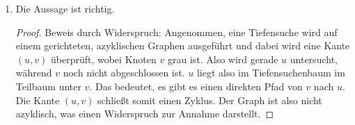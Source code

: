 \documentclass[11pt,a4paper]{article}
\begin{document}
\begin{loesung}
\begin{enumerate}
        \item Die Aussage ist richtig.
        \begin{proof}
            Beweis durch Widerspruch:
            Angenommen, eine Tiefensuche wird auf einem gerichteten, azyklischen Graphen ausgeführt und dabei wird eine Kante $(u, v)$ überprüft, wobei Knoten $v$ grau ist.
            Also wird gerade $u$ untersucht, während $v$ noch nicht abgeschlossen ist.
            $u$ liegt also im Tiefensuchenbaum im Teilbaum unter $v$.
            Das bedeutet, es gibt es einen direkten Pfad von $v$ nach $u$.
            Die Kante $(u, v)$ schließt somit einen Zyklus.
            Der Graph ist also nicht azyklisch, was einen Widerspruch zur Annahme darstellt.
        \end{proof}
    \end{enumerate}
\end{loesung}
\end{document}
